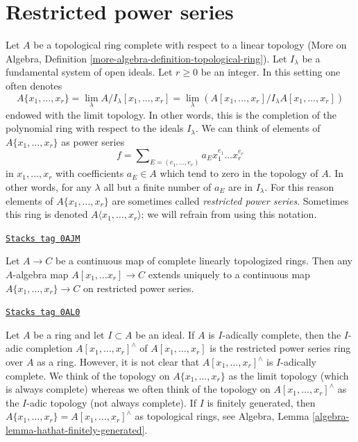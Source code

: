 \section{Restricted power series}
\label{formal-spaces-section-restricted-power-series}
Let $A$ be a topological ring complete with respect to a linear
topology (More on Algebra, Definition
\ref{more-algebra-definition-topological-ring}).
Let $I_\lambda$ be a fundamental system of open ideals.
Let $r \geq 0$ be an integer. In this setting one often
denotes
$$
A\{x_1, \ldots, x_r\} =
\lim_\lambda A/I_\lambda[x_1, \ldots, x_r] =
\lim_\lambda (A[x_1, \ldots, x_r]/I_\lambda A[x_1, \ldots, x_r])
$$
endowed with the limit topology. In other words, this is
the completion of the polynomial ring with respect to the
ideals $I_\lambda$. We can think of elements of $A\{x_1, \ldots, x_r\}$ as
power series
$$
f = \sum\nolimits_{E = (e_1, \ldots, e_r)} a_E x_1^{e_1} \ldots x_r^{e_r}
$$
in $x_1, \ldots, x_r$ with coefficients $a_E \in A$ which tend
to zero in the topology of $A$. In other words, for any $\lambda$
all but a finite number of $a_E$ are in $I_\lambda$.
For this reason elements of $A\{x_1, \ldots, x_r\}$ are sometimes
called {\it restricted power series}.
Sometimes this ring is denoted $A\langle x_1, \ldots, x_r\rangle$;
we will refrain from using this notation.

\begin{remark}

\label{formal-spaces-remark-universal-property}
\href{https://stacks.math.columbia.edu/tag/0AJM}{\texttt{Stacks tag 0AJM}}

\begin{reference}
\cite[Chapter 0, 7.5.3]{EGA}
\end{reference}
Let $A \to C$ be a continuous map of complete linearly topologized rings.
Then any $A$-algebra map $A[x_1, \ldots x_r] \to C$ extends uniquely to a
continuous map $A\{x_1, \ldots, x_r\} \to C$ on restricted power series.
\end{remark}

\begin{remark}
\label{formal-spaces-remark-I-adic-completion-and-restricted-power-series}
\href{https://stacks.math.columbia.edu/tag/0AL0}{\texttt{Stacks tag 0AL0}}

Let $A$ be a ring and let $I \subset A$ be an ideal. If $A$ is $I$-adically
complete, then the $I$-adic completion $A[x_1, \ldots, x_r]^\wedge$ of
$A[x_1, \ldots, x_r]$ is the restricted power series ring over $A$ as a
ring. However, it is not clear that $A[x_1, \ldots, x_r]^\wedge$ is
$I$-adically complete. We think of the topology on $A\{x_1, \ldots, x_r\}$
as the limit topology (which is always complete) whereas we often think of
the topology on $A[x_1, \ldots, x_r]^\wedge$ as the $I$-adic topology
(not always complete). If $I$ is finitely generated, then
$A\{x_1, \ldots, x_r\} = A[x_1, \ldots, x_r]^\wedge$ as topological
rings, see Algebra, Lemma \ref{algebra-lemma-hathat-finitely-generated}.
\end{remark}

